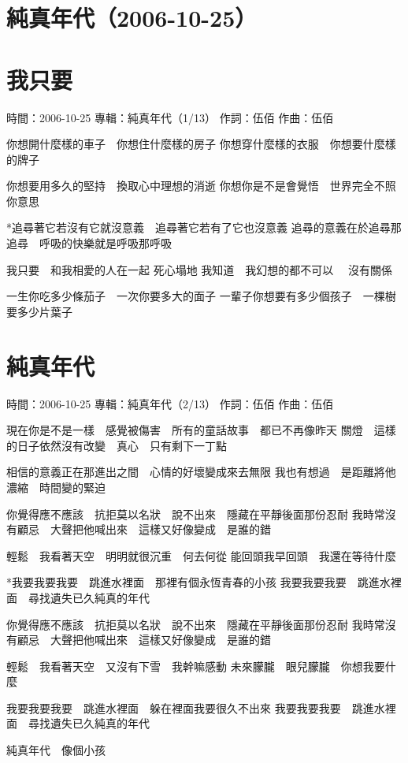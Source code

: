 \documentclass[UTF8,a4paper,oneside,twocolumn,12pt]{ctexbook}
\newcommand{\infopair}[2]{\textbullet #1：#2}
\newcommand{\zc}[1][伍佰]{\infopair{作詞}{#1}}
\newcommand{\zq}[1][伍佰]{\infopair{作曲}{#1}}
\newcommand{\zj}[1]{\infopair{專輯}{#1}}
\newcommand{\sj}[1]{\infopair{時間}{#1}}
\newenvironment{info}{\begin{flushleft}\kaishu
	}
	{\end{flushleft}\normalsize\yahei\par}
\newenvironment{lyric}{
	}
{}
\begin{document}
\section*{純真年代（2006-10-25）}
\section{我只要}
\begin{info}
	\sj{2006-10-25}
	\zj{純真年代（1/13）}
	\zc
	\zq
\end{info}
\begin{lyric}
	你想開什麼樣的車子　你想住什麼樣的房子
	你想穿什麼樣的衣服　你想要什麼樣的牌子

	你想要用多久的堅持　換取心中理想的消逝
	你想你是不是會覺悟　世界完全不照你意思

	*追尋著它若沒有它就沒意義　追尋著它若有了它也沒意義
	追尋的意義在於追尋那追尋　呼吸的快樂就是呼吸那呼吸

	我只要　和我相愛的人在一起 死心塌地
	我知道　我幻想的都不可以　 沒有關係

	一生你吃多少條茄子　一次你要多大的面子
	一輩子你想要有多少個孩子　一棵樹要多少片葉子
\end{lyric}

\section{純真年代}
\begin{info}
	\sj{2006-10-25}
	\zj{純真年代（2/13）}
	\zc
	\zq
\end{info}
\begin{lyric}
	現在你是不是一樣　感覺被傷害　所有的童話故事　都已不再像昨天
	關燈　這樣的日子依然沒有改變　真心　只有剩下一丁點

	相信的意義正在那進出之間　心情的好壞變成來去無限
	我也有想過　是距離將他濃縮　時間變的緊迫

	你覺得應不應該　抗拒莫以名狀　說不出來　隱藏在平靜後面那份忍耐
	我時常沒有顧忌　大聲把他喊出來　這樣又好像變成　是誰的錯

	輕鬆　我看著天空　明明就很沉重　何去何從
	能回頭我早回頭　我還在等待什麼

	*我要我要我要　跳進水裡面　那裡有個永恆青春的小孩
	我要我要我要　跳進水裡面　尋找遺失已久純真的年代

	你覺得應不應該　抗拒莫以名狀　說不出來　隱藏在平靜後面那份忍耐
	我時常沒有顧忌　大聲把他喊出來　這樣又好像變成　是誰的錯

	輕鬆　我看著天空　又沒有下雪　我幹嘛感動
	未來朦朧　眼兒朦朧　你想我要什麼

	我要我要我要　跳進水裡面　躲在裡面我要很久不出來
	我要我要我要　跳進水裡面　尋找遺失已久純真的年代

	純真年代　像個小孩
\end{lyric}
\end{document}
